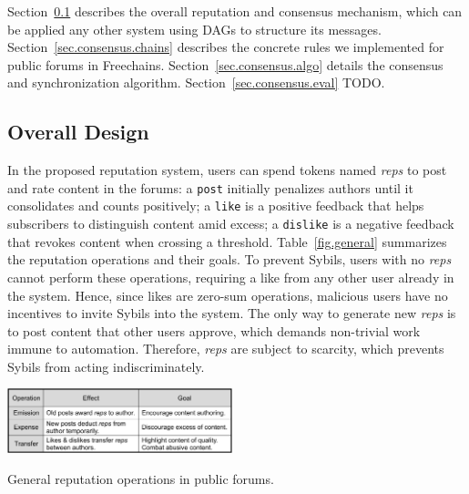 \documentclass[10pt,journal,compsoc]{IEEEtran}
\newcommand{\FC}       {Freechains\xspace}
\newcommand{\reps}     {\emph{reps}\xspace}
\newcommand{\code}[1]  {\texttt{\footnotesize{#1}}}
\begin{document}
Section~\ref{sec.consensus.design} describes the overall reputation and
consensus mechanism, which can be applied any other system using DAGs to
structure its messages.
Section~\ref{sec.consensus.chains} describes the concrete rules we implemented
for public forums in \FC.
Section~\ref{sec.consensus.algo} details the consensus and synchronization
algorithm.
Section~\ref{sec.consensus.eval} TODO.

\subsection{Overall Design}
\label{sec.consensus.design}

In the proposed reputation system, users can spend tokens named \reps to post
and rate content in the forums:
a \code{post} initially penalizes authors until it consolidates and counts
positively;
a \code{like} is a positive feedback that helps subscribers to distinguish
content amid excess;
a \code{dislike} is a negative feedback that revokes content when crossing a
threshold.
Table~\ref{fig.general} summarizes the reputation operations and their goals.
To prevent Sybils, users with no \reps cannot perform these operations,
requiring a like from any other user already in the system.
Hence, since likes are zero-sum operations, malicious users have no incentives
to invite Sybils into the system.
The only way to generate new \reps is to post content that other users approve,
which demands non-trivial work immune to automation.
Therefore, \reps are subject to scarcity, which prevents Sybils from acting
indiscriminately.

\begin{table}
\centering
\includegraphics[width=0.49\textwidth]{general.png}
\caption{General reputation operations in public forums.}
\label{fig.general}
\end{table}
\end{document}
